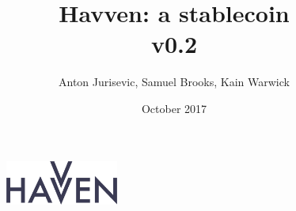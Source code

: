 \documentclass{article}
\begin{document}
\newcommand{\CUR}{\textsc{cur}}
\newcommand{\NOM}{\textsc{nom}}


\title{Havven: a stablecoin \\ v0.2}
\author{Anton Jurisevic, Samuel Brooks, Kain Warwick}
\date{October 2017}


\begin{figure}
    \centering
    \includegraphics[width=0.33\textwidth]{img/havvenlogo}
\end{figure}
\maketitle










\end{document}
